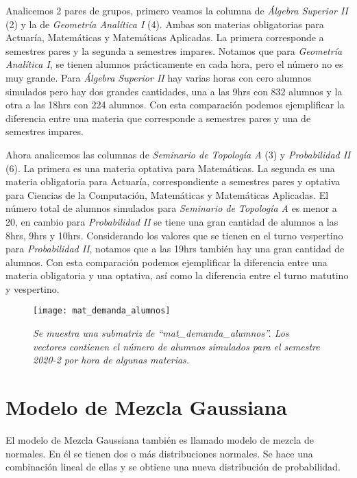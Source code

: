 Analicemos 2 pares de grupos, primero veamos la columna de \textit{Álgebra Superior II} (2) y la de \textit{Geometría Analítica I} (4). Ambas son materias obligatorias para Actuaría, Matemáticas y Matemáticas Aplicadas. La primera corresponde a semestres pares y la segunda a semestres impares. Notamos que para \textit{Geometría Analítica I}, se tienen alumnos prácticamente en cada hora, pero el número no es muy grande. Para \textit{Álgebra Superior II} hay varias horas con cero alumnos simulados pero hay dos grandes cantidades, una a las 9hrs con 832 alumnos y la otra a las 18hrs con 224 alumnos. Con esta comparación podemos ejemplificar la diferencia entre una materia que corresponde a semestres pares y una de semestres impares.

Ahora analicemos las columnas de \textit{Seminario de Topología A} (3) y \textit{Probabilidad II} (6). La primera es una materia optativa para Matemáticas. La segunda es una materia obligatoria para Actuaría, correspondiente a semestres pares y optativa para Ciencias de la Computación, Matemáticas y Matemáticas Aplicadas. El número total de alumnos simulados para \textit{Seminario de Topología A} es menor a 20, en cambio para \textit{Probabilidad II} se tiene una gran cantidad de alumnos a las 8hrs, 9hrs y 10hrs. Considerando los valores que se tienen en el turno vespertino para \textit{Probabilidad II}, notamos que a las 19hrs también hay una gran cantidad de alumnos. Con esta comparación podemos ejemplificar la diferencia entre una materia obligatoria y una optativa, así como la diferencia entre el turno matutino y vespertino.


\begin{figure}[H]
\centering
\texttt{[image: mat\_demanda\_alumnos]} %
\caption[\textit{Matriz con demanda simulada para el 2020-2}]{\textit{Se muestra una submatriz de ``mat\_demanda\_alumnos''. Los vectores contienen el número de alumnos simulados para el semestre 2020-2 por hora de algunas materias.}}\label{matDemandaAlum}
\end{figure}


\section{Modelo de Mezcla Gaussiana} \label{sec_GMM}

El modelo de Mezcla Gaussiana también es llamado modelo de mezcla de normales. En él se tienen dos o más distribuciones normales. Se hace una combinación lineal de ellas y se obtiene una nueva distribución de probabilidad.

